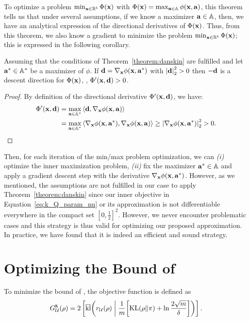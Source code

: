 \begin{noaddcontents}
\noindent To optimize a problem $\min_{\mathbf{x}\in\mathbb{R}^b}\Phi(\mathbf{x})$ with $\Phi(\mathbf{x}) = \max_{\mathbf{a}\in\mathbb{A}}\phi(\mathbf{x}, \mathbf{a})$, this theorem tells us that under several assumptions, if we know a maximizer $\mathbf{a}\in\mathbb{A}$, then, we have an analytical expression of the directional derivatives of $\Phi(\mathbf{x})$. 
Thus, from this theorem, we also know a gradient to minimize the problem $\min_{\mathbf{x}\in\mathbb{R}^b}\Phi(\mathbf{x})$; this is expressed in the following corollary. 

\begin{corollary} Assuming that the conditions of Theorem~\ref{theorem:danskin} are fulfilled and let $\mathbf{a}^*\in\mathbb{A}^{*}$ be a maximizer of $\phi$. 
If $\mathbf{d}=\nabla_{\mathbf{x}}\phi(\mathbf{x}, \mathbf{a}^*)$ with $\left\vert\mathbf{d}\right\vert^2_2>0$ then $-\mathbf{d}$ is a descent direction for $\Phi(\mathbf{x})$, \ie, $\Phi'(\mathbf{x}, \mathbf{d}) > 0$.
\end{corollary}
\begin{proof} By definition of the directional derivative $\Phi'(\mathbf{x}, \mathbf{d})$, we have:
\begin{align*}
        \Phi'(\mathbf{x}, \mathbf{d}) &= \max_{\mathbf{a}\in\mathbb{A}^*}\left\langle\mathbf{d},\nabla_{\mathbf{x}}\phi(\mathbf{x}, \mathbf{a})\right\rangle\\
        &= \max_{\mathbf{a}\in\mathbb{A}^*}\left\langle\nabla_{\mathbf{x}}\phi(\mathbf{x}, \mathbf{a}^*),\nabla_{\mathbf{x}}\phi(\mathbf{x}, \mathbf{a})\right\rangle \ge \left\vert\nabla_{\mathbf{x}}\phi(\mathbf{x}, \mathbf{a}^*)\right\vert_{2}^{2}> 0.
    \end{align*}
    \end{proof}
\noindent Then, for each iteration of the min/max problem optimization, we can {\it (i)} optimize the inner maximization problem, {\it (ii)} fix the maximizer $\mathbf{a}^*\in\mathbb{A}$ and apply a gradient descent step with the derivative $\nabla_{\mathbf{x}}\phi(\mathbf{x}, \mathbf{a}^*)$.
However, as we mentioned, the assumptions are not fulfilled in our case to apply Theorem~\ref{theorem:danskin} since our inner objective in Equation~\eqref{eq:k_Q_param_nu} or its approximation is not differentiable everywhere in the compact set $[0, \tfrac{1}{2}]^2$.
However, we never encounter problematic cases and this strategy is thus valid for optimizing our proposed approximation.
In practice, we have found that it is indeed an efficient and sound strategy.

\section{Optimizing the Bound of }
\label{ap:mv:sec:pb-2gibbs}

To minimize the bound of , the objective function is defined as 
\begin{align*}
G^{\tt R}_{\mathcal{U}}(\rho) = 2\left[ \overline{\operatorname{kl}}\!\left( r_{\mathcal{U}}(\rho) \;\middle|\; \frac{1}{m}\!\left[\operatorname{KL}(\rho\|\pi)+\ln\frac{2\sqrt{m}}{\delta}\right]\right) \right].
\end{align*}


\end{noaddcontents}
